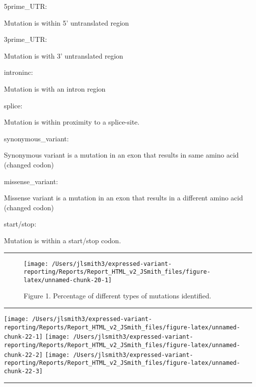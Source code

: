 \documentclass[
]{article}
\begin{document}
5prime\_UTR:

Mutation is within 5' untranslated region

3prime\_UTR:

Mutation is with 3' untranslated region

introninc:

Mutation is with an intron region

splice:

Mutation is within proximity to a splice-site.

synonymous\_variant:

Synonymous variant is a mutation in an exon that results in same amino
acid (changed codon)

missense\_variant:

Missense variant is a mutation in an exon that results in a different
amino acid (changed codon)

start/stop:

Mutation is within a start/stop codon.

\begin{center}\rule{0.5\linewidth}{0.5pt}\end{center}

\begin{figure}

{\centering \texttt{[image: /Users/jlsmith3/expressed-variant-reporting/Reports/Report\_HTML\_v2\_JSmith\_files/figure-latex/unnamed-chunk-20-1]} 

}

\caption{Figure 1. Percentage of different types of mutations identified.}\label{fig:unnamed-chunk-20}
\end{figure}

\begin{center}\rule{0.5\linewidth}{0.5pt}\end{center}

\begin{center}\texttt{[image: /Users/jlsmith3/expressed-variant-reporting/Reports/Report\_HTML\_v2\_JSmith\_files/figure-latex/unnamed-chunk-22-1]} \texttt{[image: /Users/jlsmith3/expressed-variant-reporting/Reports/Report\_HTML\_v2\_JSmith\_files/figure-latex/unnamed-chunk-22-2]} \texttt{[image: /Users/jlsmith3/expressed-variant-reporting/Reports/Report\_HTML\_v2\_JSmith\_files/figure-latex/unnamed-chunk-22-3]} \end{center}

\begin{center}\rule{0.5\linewidth}{0.5pt}\end{center}
\end{document}
